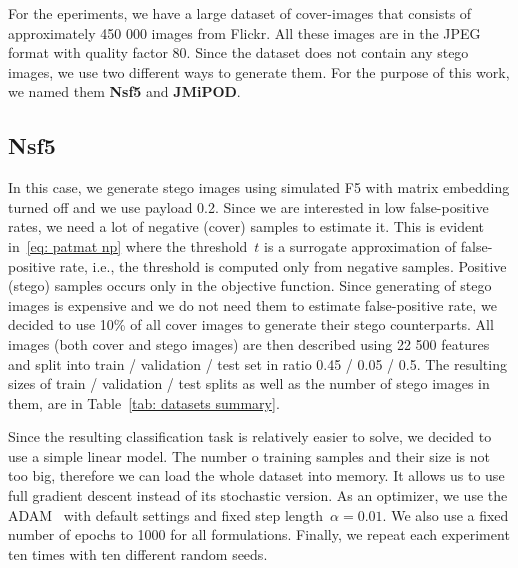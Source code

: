 For the eperiments, we have a large dataset of cover-images that consists of approximately 450 000 images from Flickr. All these images are in the JPEG format with quality factor 80. Since the dataset does not contain any stego images, we use two different ways to generate them. For the purpose of this work, we named them \textbf{Nsf5} and \textbf{JMiPOD}.

\subsection{Nsf5}

In this case, we generate stego images using simulated F5 with matrix embedding turned off and we use payload 0.2. Since we are interested in low false-positive rates, we need a lot of negative (cover) samples to estimate it. This is evident in~\eqref{eq: patmat np} where the threshold~$t$ is a surrogate approximation of false-positive rate, i.e., the threshold is computed only from negative samples. Positive (stego) samples occurs only in the objective function. Since generating of stego images is expensive and we do not need them to estimate false-positive rate, we decided to use 10\% of all cover images to generate their stego counterparts. All images (both cover and stego images) are then described using 22 500 features and split into train / validation / test set in ratio 0.45 / 0.05 / 0.5. The resulting sizes of train / validation / test splits as well as the number of stego images in them, are in Table~\ref{tab: datasets summary}. 

Since the resulting classification task is relatively easier to solve, we decided to use a simple linear model. The number o training samples and their size is not too big, therefore we can load the whole dataset into memory. It allows us to use full gradient descent instead of its stochastic version. As an optimizer, we use the ADAM~\cite{kingma2014adam} with default settings and fixed step length~$\alpha = 0.01.$ We also use a fixed number of epochs to 1000 for all formulations. Finally, we repeat each experiment ten times with ten different random seeds.

